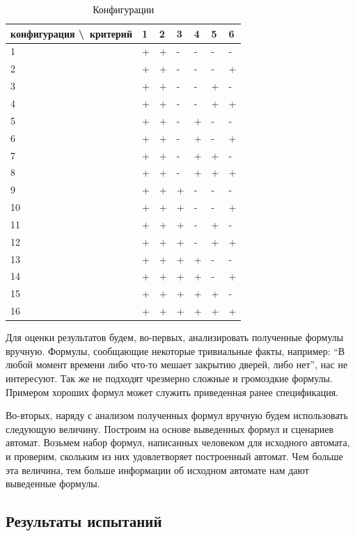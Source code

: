 \documentclass[12pt,fleqn]{article}
\begin{document}
\begin{table}
\centering
\caption{Конфигурации}
\begin{tabular}{ l | l | l | l | l | l | l }
конфигурация \textbackslash \ критерий & 1 & 2 & 3 & 4 & 5 & 6 \\
\hline
1  & + & + & - & - & - & - \\
2  & + & + & - & - & - & + \\
3  & + & + & - & - & + & - \\
4  & + & + & - & - & + & + \\
5  & + & + & - & + & - & - \\
6  & + & + & - & + & - & + \\
7  & + & + & - & + & + & - \\
8  & + & + & - & + & + & + \\
9  & + & + & + & - & - & - \\
10 & + & + & + & - & - & + \\
11 & + & + & + & - & + & - \\
12 & + & + & + & - & + & + \\
13 & + & + & + & + & - & - \\
14 & + & + & + & + & - & + \\
15 & + & + & + & + & + & - \\
16 & + & + & + & + & + & + \\
\end{tabular}
\label{ct}
\end{table}

Для оценки результатов будем, во-первых, анализировать полученные формулы вручную. Формулы, сообщающие некоторые тривиальные
факты, например: ``В любой момент времени либо что-то мешает закрытию дверей, либо нет'', нас не интересуют.
Так же не подходят чрезмерно сложные и громоздкие формулы. Примером хороших формул может служить приведенная ранее спецификация.

Во-вторых, наряду с анализом полученных формул вручную будем использовать следующую величину.
Построим на основе выведенных формул и сценариев автомат. Возьмем набор формул, написанных человеком для исходного автомата, и
проверим, скольким из них удовлетворяет построенный автомат. Чем больше эта величина, тем больше информации об исходном
автомате нам дают выведенные формулы.

\subsection{Результаты испытаний}
\end{document}
